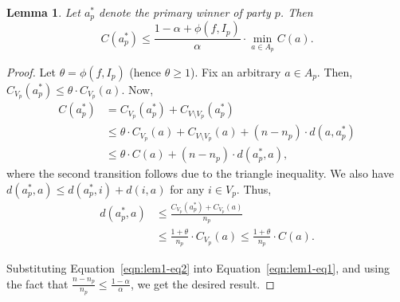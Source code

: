 \documentclass[letterpaper]{article} %
\newtheorem{lemma}[theorem]{Lemma}
\theoremstyle{definition}
\begin{document}
\begin{lemma}
\label{lem:winner-opt-same-party}
	Let $a^*_p$ denote the primary winner of party $p$. Then
	$$
	C(a^*_p) \le \frac{1-\alpha+\phi(f,I_p)}{\alpha} \cdot \min_{a \in A_p} C(a).
	$$
\end{lemma}
\begin{proof}
	Let $\theta = \phi(f,I_p)$ (hence $\theta\geq 1$). Fix an arbitrary $a \in A_p$. Then, $C_{V_p}(a^*_p) \le \theta \cdot C_{V_p}(a)$. %
	Now,
	\begin{align}
	C(a^*_p) &= C_{V_p}(a^*_p) + C_{V\setminus V_{p}}(a^*_p) \nonumber\\
	&\le \theta\cdot C_{V_p}(a) + C_{V\setminus V_{p}}(a) +(n-n_{p}) \cdot d(a,a^*_p) \nonumber\\
	&\le \theta \cdot C(a) + (n-n_{p}) \cdot d(a^*_p,a),
	\label{eqn:lem1-eq1}
	\end{align}
	where the second transition follows %
	due to the triangle inequality.
	We also have $d(a^*_p,a) \le d(a^*_p,i)+d(i,a)$ for any $i \in V_p$. Thus,
	\begin{align}
	d(a^*_p,a) &\le \frac{C_{V_p}(a^*_p)+C_{V_p}(a)}{n_p} \nonumber\\
	&\le \frac{1+\theta}{n_p} \cdot C_{V_p}(a) \le \frac{1+\theta}{n_p} \cdot C(a).
	\label{eqn:lem1-eq2}
	\end{align}

	Substituting Equation~\eqref{eqn:lem1-eq2} into Equation~\eqref{eqn:lem1-eq1}, and using the fact that $\frac{n-n_{p}}{n_p} \le \frac{1-\alpha}{\alpha}$, we get the desired result.
\end{proof}
\end{document}
